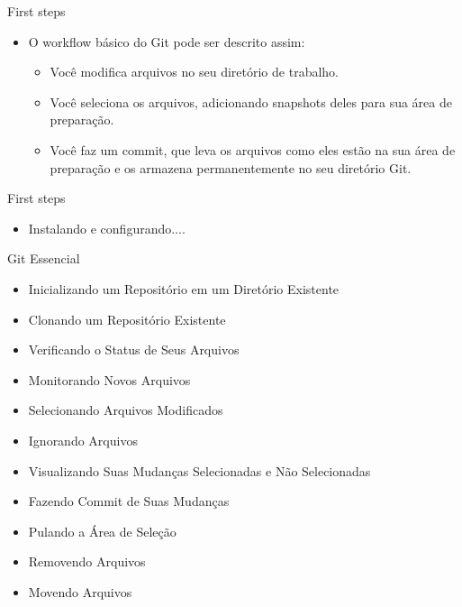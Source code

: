 \documentclass[t]{beamer}
\begin{document}
\begin{frame} {First steps}
	\begin{itemize}
		\item O workflow básico do Git pode ser descrito assim:
		\begin{itemize}
			\item Você modifica arquivos no seu diretório de trabalho.
			\item Você seleciona os arquivos, adicionando snapshots deles para sua área de preparação.
			\item Você faz um commit, que leva os arquivos como eles estão na sua área de preparação e os armazena permanentemente no seu diretório Git.
		\end{itemize}
	\end{itemize}
\end{frame}
	
\begin{frame} {First steps}
	\begin{itemize}
		\item Instalando e configurando....		
	\end{itemize}
\end{frame}

\begin{frame} {Git Essencial}
	\begin{itemize}
		\item Inicializando um Repositório em um Diretório Existente
		\item Clonando um Repositório Existente
		\item Verificando o Status de Seus Arquivos
		\item Monitorando Novos Arquivos
		\item Selecionando Arquivos Modificados
		\item Ignorando Arquivos
		\item Visualizando Suas Mudanças Selecionadas e Não Selecionadas
		\item Fazendo Commit de Suas Mudanças
		\item Pulando a Área de Seleção
		\item Removendo Arquivos
		\item Movendo Arquivos

	\end{itemize}
\end{frame}
\end{document}
